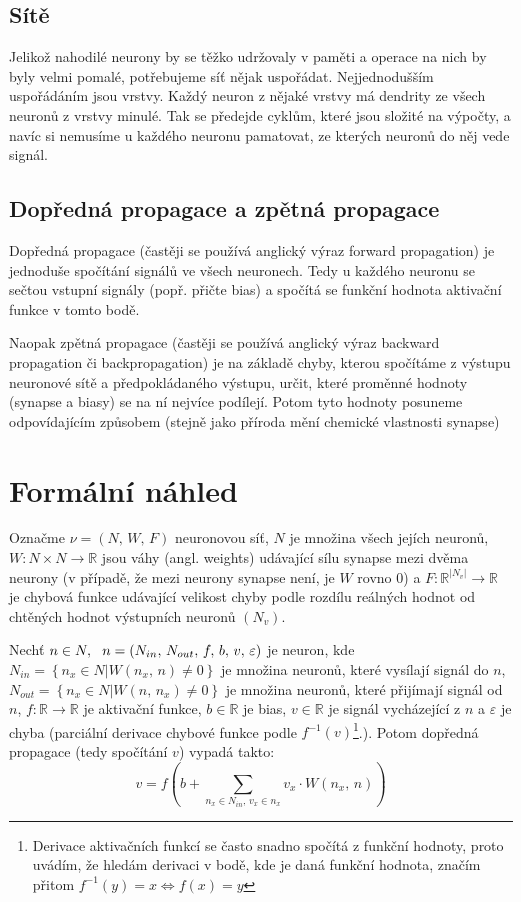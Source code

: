 \documentclass[12pt]{report}			%
\newcommand{\R}{\mathbb{R}}   			%
\begin{document}
				\subsection{Sítě}
					Jelikož nahodilé neurony by se těžko udržovaly v paměti a operace na nich by byly velmi pomalé, potřebujeme síť nějak uspořádat. Nejjednodušším uspořádáním jsou vrstvy. Každý neuron z nějaké vrstvy má \gls{dendrit}y ze všech neuronů z vrstvy minulé. Tak se předejde cyklům, které jsou složité na výpočty, a navíc si nemusíme u každého neuronu pamatovat, ze kterých neuronů do něj vede signál.
					
				\subsection{Dopředná propagace a zpětná propagace}
					Dopředná propagace (častěji se používá anglický výraz forward propagation) je jednoduše spočítání signálů ve všech neuronech. Tedy u každého neuronu se sečtou vstupní signály (popř. přičte bias) a spočítá se funkční hodnota aktivační funkce v tomto bodě.
					
					Naopak zpětná propagace (častěji se používá anglický výraz backward propagation či backpropagation) je na základě chyby, kterou spočítáme z výstupu neuronové sítě a předpokládaného výstupu, určit, které proměnné hodnoty (\gls{synapse} a biasy) se na ní nejvíce podílejí. Potom tyto hodnoty posuneme odpovídajícím způsobem (stejně jako příroda mění chemické vlastnosti \gls{synapse})
			
			
			\section{Formální náhled}
				Označme $\nu = (N,\,W,\,F)$ neuronovou síť, $N$ je množina všech jejích neuronů, $W\!: N\times N \rightarrow \R$ jsou váhy (angl. weights) udávající sílu synapse mezi dvěma neurony (v případě, že mezi neurony synapse není, je $W$ rovno $0$) a $F\!: \R^{|N_v|} \rightarrow \R$ je chybová funkce udávající velikost chyby podle rozdílu reálných hodnot od chtěných hodnot výstupních neuronů $\left(N_v\right)$.
			
				Nechť $n \in N, \hspace{1.5ex} n = \left(N_{in},\,N_{out},\,f,\,b,\,v,\,\varepsilon\right)$ je neuron, kde $N_{in} = \left\{n_x \in N|W\left(n_x,\,n\right) \neq 0\right\}$ je množina neuronů, které vysílají signál do $n$, $N_{out} = \left\{n_x \in N|W\left(n,\,n_x\right) \neq 0\right\}$ je množina neuronů, které přijímají signál od $n$, $f\!: \R \rightarrow \R$ je aktivační funkce, $b \in \R$ je bias, $v \in \R$ je signál vycházející z $n$ a $\varepsilon$ je chyba (parciální derivace chybové funkce podle $f^{-1}(v)$\footnote{Derivace aktivačních funkcí se často snadno spočítá z funkční hodnoty, proto uvádím, že hledám derivaci v bodě, kde je daná funkční hodnota, značím přitom $f^{-1}(y) = x \Leftrightarrow f(x) = y$}.). Potom dopředná propagace (tedy spočítání $v$) vypadá takto:
				$$ v = f\left(b + \sum_{n_x \in N_{in},\,v_x \in n_x} v_x \cdot W\left(n_x,\,n\right) \right) $$
				
\end{document}
